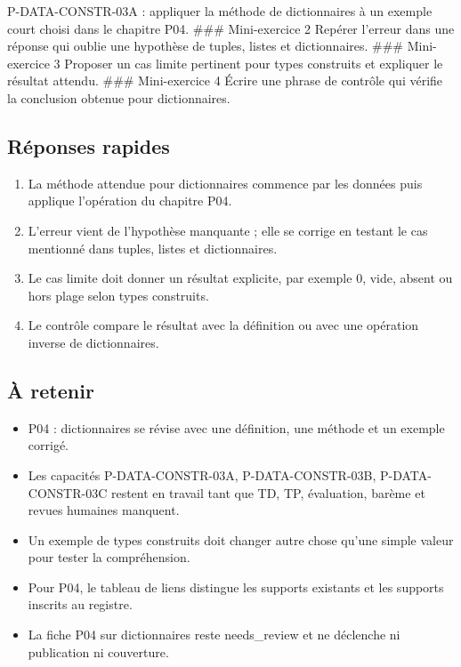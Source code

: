 P-DATA-CONSTR-03A : appliquer la méthode de dictionnaires à un exemple
court choisi dans le chapitre P04. \#\#\# Mini-exercice 2 Repérer
l'erreur dans une réponse qui oublie une hypothèse de tuples, listes et
dictionnaires. \#\#\# Mini-exercice 3 Proposer un cas limite pertinent
pour types construits et expliquer le résultat attendu. \#\#\#
Mini-exercice 4 Écrire une phrase de contrôle qui vérifie la conclusion
obtenue pour dictionnaires.

\subsection{Réponses rapides}

\begin{enumerate}
\def\labelenumi{\arabic{enumi}.}
\tightlist
\item
  La méthode attendue pour dictionnaires commence par les données puis
  applique l'opération du chapitre P04.
\item
  L'erreur vient de l'hypothèse manquante ; elle se corrige en testant
  le cas mentionné dans tuples, listes et dictionnaires.
\item
  Le cas limite doit donner un résultat explicite, par exemple 0, vide,
  absent ou hors plage selon types construits.
\item
  Le contrôle compare le résultat avec la définition ou avec une
  opération inverse de dictionnaires.
\end{enumerate}

\subsection{À retenir}

\begin{itemize}
\tightlist
\item
  P04 : dictionnaires se révise avec une définition, une méthode et un
  exemple corrigé.
\item
  Les capacités P-DATA-CONSTR-03A, P-DATA-CONSTR-03B, P-DATA-CONSTR-03C
  restent en travail tant que TD, TP, évaluation, barème et revues
  humaines manquent.
\item
  Un exemple de types construits doit changer autre chose qu'une simple
  valeur pour tester la compréhension.
\item
  Pour P04, le tableau de liens distingue les supports existants et les
  supports inscrits au registre.
\item
  La fiche P04 sur dictionnaires reste needs\_review et ne déclenche ni
  publication ni couverture.
\end{itemize}

